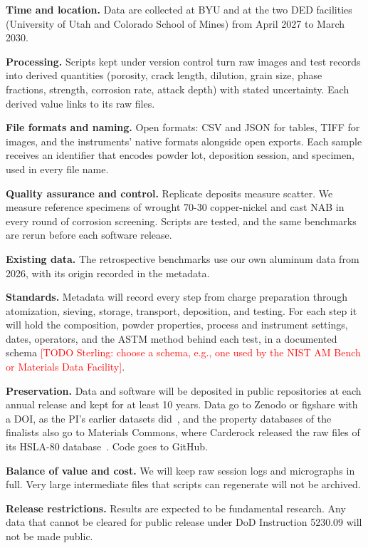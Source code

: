 \documentclass[12pt,letterpaper]{article}
\newcommand{\todo}[1]{\textcolor{red}{[TODO Sterling: #1]}}
\begin{document}
\textbf{Time and location.} Data are collected at BYU and at the two DED
facilities (University of Utah and Colorado School of Mines) from April 2027
to March 2030.

\textbf{Processing.} Scripts kept under version control turn raw images and
test records into derived quantities (porosity, crack length, dilution, grain
size, phase fractions, strength, corrosion rate, attack depth) with stated
uncertainty. Each derived value links to its raw files.

\textbf{File formats and naming.} Open formats: CSV and JSON for tables, TIFF
for images, and the instruments' native formats alongside open exports.
Each sample receives an identifier that encodes powder lot, deposition
session, and specimen, used in every file name.

\textbf{Quality assurance and control.} Replicate deposits measure scatter.
We measure reference specimens of wrought 70-30 copper-nickel and cast NAB
in every round of corrosion screening. Scripts are tested, and the same
benchmarks are rerun before each software release.

\textbf{Existing data.} The retrospective benchmarks use our own
aluminum data from 2026, with its origin recorded in the metadata.

\textbf{Standards.} Metadata will record every step from charge preparation
through atomization, sieving, storage, transport, deposition, and testing.
For each step it will hold the composition, powder properties, process and
instrument settings, dates, operators, and the ASTM method behind each test,
in a documented schema \todo{choose a schema, e.g., one used by the NIST AM
Bench or Materials Data Facility}.

\textbf{Preservation.} Data and software will be deposited in public
repositories at each annual release and kept for at least 10 years.
Data go to Zenodo or figshare with a DOI, as the PI's earlier datasets did~\cite{mptimesplit}, and the property databases of the finalists also go to Materials Commons, where Carderock released the raw files of its HSLA-80 database~\cite{fisher2022mc}.
Code goes to GitHub.

\textbf{Balance of value and cost.} We will keep raw session logs and
micrographs in full. Very large intermediate files that scripts can
regenerate will not be archived.

\textbf{Release restrictions.} Results are expected to be fundamental
research. Any data that cannot be cleared for public release under DoD
Instruction 5230.09 will not be made public.
\end{document}
